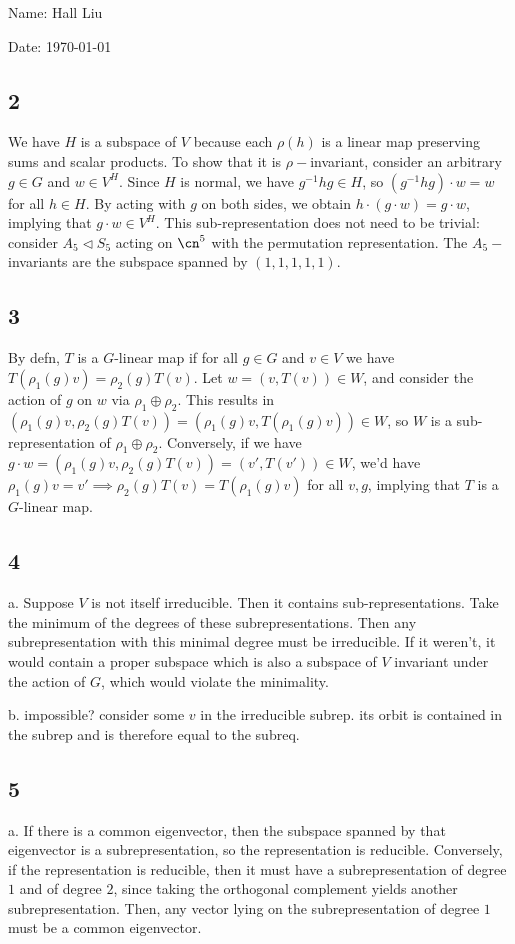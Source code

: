 \documentclass{article}
\begin{document}
Name: Hall Liu

Date: \today 
\vspace{1.5cm}
\subsection*{2}
We have $H$ is a subspace of $V$ because each $\rho(h)$ is a linear map preserving sums and scalar products. To show that it is $\rho-$invariant, consider an arbitrary $g\in G$ and $w\in V^H$. Since $H$ is normal, we have $g^{-1}hg\in H$, so $(g^{-1}hg)\cdot w=w$ for all $h\in H$. By acting with $g$ on both sides, we obtain $h\cdot(g\cdot w)=g\cdot w$, implying that $g\cdot w\in V^H$. This sub-representation does not need to be trivial: consider $A_5\triangleleft S_5$ acting on $\cn^5$ with the permutation representation. The $A_5-$invariants are the subspace spanned by $(1,1,1,1,1)$.
\subsection*{3}
By defn, $T$ is a $G$-linear map if for all $g\in G$ and $v\in V$ we have $T(\rho_1(g)v)=\rho_2(g)T(v)$. Let $w=(v,T(v))\in W$, and consider the action of $g$ on $w$ via $\rho_1\oplus\rho_2$. This results in $(\rho_1(g)v,\rho_2(g)T(v))=(\rho_1(g)v,T(\rho_1(g)v))\in W$, so $W$ is a sub-representation of $\rho_1\oplus\rho_2$. Conversely, if we have $g\cdot w=(\rho_1(g)v,\rho_2(g)T(v))=(v', T(v'))\in W$, we'd have $\rho_1(g)v=v'\implies \rho_2(g)T(v)=T(\rho_1(g)v)$ for all $v,g$, implying that $T$ is a $G$-linear map.
\subsection*{4}
a. Suppose $V$ is not itself irreducible. Then it contains sub-representations. Take the minimum of the degrees of these subrepresentations. Then any subrepresentation with this minimal degree must be irreducible. If it weren't, it would contain a proper subspace which is also a subspace of $V$ invariant under the action of $G$, which would violate the minimality.

\noindent b. impossible? consider some $v$ in the irreducible subrep. its orbit is contained in the subrep and is therefore equal to the subreq. 
\subsection*{5}
a. If there is a common eigenvector, then the subspace spanned by that eigenvector is a subrepresentation, so the representation is reducible. Conversely, if the representation is reducible, then it must have a subrepresentation of degree $1$ and of degree $2$, since taking the orthogonal complement yields another subrepresentation. Then, any vector lying on the subrepresentation of degree $1$ must be a common eigenvector. 
\end{document}

